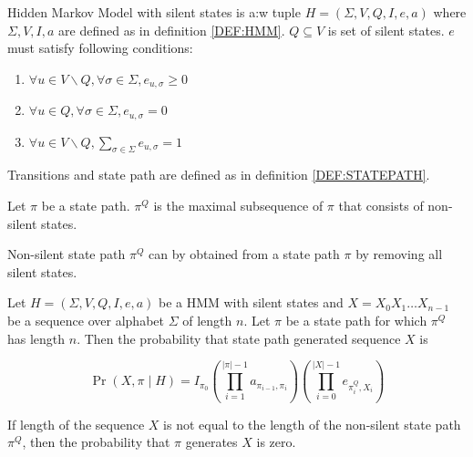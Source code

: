 \begin{definition}
Hidden Markov Model with silent states is a:w
tuple $H=(\Sigma,V,Q,I,e,a)$
where $\Sigma,V,I,a$ are defined as in definition \ref{DEF:HMM}. $Q\subseteq V$ is set of
silent states. $e$ must satisfy following conditions:
\begin{enumerate}
\item $\forall u\in V\backslash Q,\forall \sigma\in\Sigma, e_{u,\sigma}\geq0$
\item $\forall u\in Q,\forall \sigma\in\Sigma, e_{u,\sigma}=0$
\item $\forall u\in V\backslash Q, \sum_{\sigma\in \Sigma}e_{u,\sigma}=1$
\end{enumerate}
\end{definition}

\begin{definition}
Transitions and state path are defined as in definition \ref{DEF:STATEPATH}. 

Let $\pi$ be a state path.  $\pi^Q$ is
the maximal subsequence of $\pi$ that consists of non-silent states.
\end{definition}

\begin{note}
Non-silent state path $\pi^Q$ can by obtained from a state path $\pi$ by removing all silent
states.
\end{note}

\begin{definition}
Let $H=(\Sigma,V,Q,I,e,a)$ be a HMM with silent states and $X=X_0X_1\dots
X_{n-1}$ be a sequence over
alphabet $\Sigma$ of length $n$. Let $\pi$ be a state path for which $\pi^Q$ has
length $n$. Then the probability that state path generated sequence $X$ is 

\[\Pr\left(X,\pi\mid H\right) =
I_{\pi_0}\left(\prod_{i=1}^{|\pi|-1}a_{\pi_{i-1},\pi_i}\right)\left(\prod_{i=0}^{|X|-1}e_{\pi^Q_i,X_i}\right)\]

If length of the sequence $X$ is not equal to the length of the non-silent state
path $\pi^Q$, then the
probability that $\pi$ generates $X$ is zero.
\end{definition}

